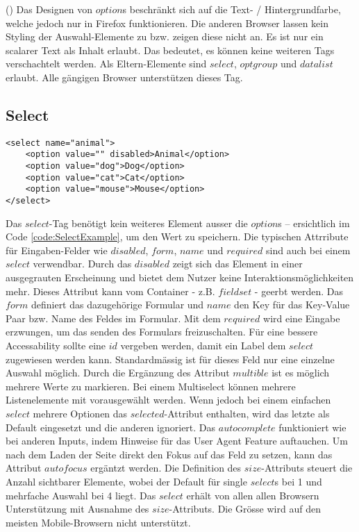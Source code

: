 (\cite{optionMdn}) Das Designen von $option$s beschränkt sich auf die Text- / Hintergrundfarbe, welche jedoch nur in Firefox funktionieren. 
Die anderen Browser lassen kein Styling der Auswahl-Elemente zu bzw. zeigen diese nicht an.
Es ist nur ein scalarer Text als Inhalt erlaubt. 
Das bedeutet, es können keine weiteren Tags verschachtelt werden.
Als Eltern-Elemente sind $select$, $optgroup$ und $datalist$ erlaubt.
Alle gängigen Browser unterstützen dieses Tag.



\subsection{Select}

\begin{lstlisting}[language = html5, caption = Select Example, label = code:SelectExample]
<select name="animal">
    <option value="" disabled>Animal</option>
    <option value="dog">Dog</option>
    <option value="cat">Cat</option>
    <option value="mouse">Mouse</option>
</select>
\end{lstlisting}

Das $select$-Tag benötigt kein weiteres Element ausser die $option$s – ersichtlich im Code \ref{code:SelectExample}, um den Wert zu speichern.
Die typischen Attrribute für Eingaben-Felder wie $disabled$, $form$, $name$ und $required$ sind auch bei einem $select$ verwendbar.
Durch das $disabled$ zeigt sich das Element in einer ausgegrauten Erscheinung und bietet dem Nutzer keine Interaktionsmöglichkeiten mehr.
Dieses Attribut kann vom Container - z.B. $fieldset$ - geerbt werden.
Das $form$ definiert das dazugehörige Formular und $name$ den Key für das Key-Value Paar bzw. Name des Feldes im Formular. 
Mit dem $required$ wird eine Eingabe erzwungen, um das senden des Formulars freizuschalten.
Für eine bessere Accessability sollte eine $id$ vergeben werden, damit ein Label dem $select$ zugewiesen werden kann.
Standardmässig ist für dieses Feld nur eine einzelne Auswahl möglich.
Durch die Ergänzung des Attribut $multible$ ist es möglich mehrere Werte zu markieren.
Bei einem Multiselect können mehrere Listenelemente mit vorausgewählt werden.
Wenn jedoch bei einem einfachen $select$ mehrere Optionen das $selected$-Attribut enthalten, wird das letzte als Default eingesetzt und die anderen ignoriert.
Das $autocomplete$ funktioniert wie bei anderen Inputs, indem Hinweise für das User Agent Feature auftauchen.
Um nach dem Laden der Seite direkt den Fokus auf das Feld zu setzen, kann das Attribut $autofocus$ ergäntzt werden.
Die Definition des $size$-Attributs steuert die Anzahl sichtbarer Elemente, wobei der Default für single $select$s bei 1 und mehrfache Auswahl bei 4 liegt.
Das $select$ erhält von allen allen Browsern Unterstützung mit Ausnahme des $size$-Attributs.
Die Grösse wird auf den meisten Mobile-Browsern nicht unterstützt.


